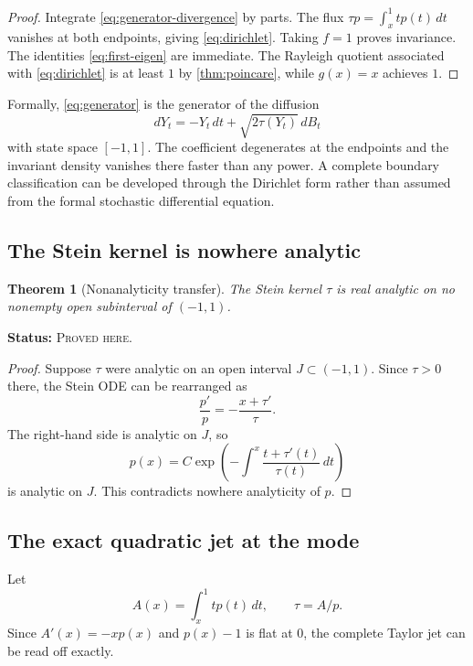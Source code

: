 \documentclass[11pt,oneside]{article}
\newtheorem{theorem}{Theorem}[section]
\theoremstyle{definition}
\theoremstyle{remark}
\newcommand{\ProvedHere}{\textcolor{statusgreen}{\textsc{Proved here}}}
\newcommand{\Status}[1]{\par\smallskip\noindent\textbf{Status:} #1.\par\smallskip}
\begin{document}
\begin{proof}
Integrate \eqref{eq:generator-divergence} by parts.  The flux
$\tau p=\int_x^1tp(t)\,dt$ vanishes at both endpoints, giving
\eqref{eq:dirichlet}.  Taking $f=1$ proves invariance.  The identities
\eqref{eq:first-eigen} are immediate.  The Rayleigh quotient associated with
\eqref{eq:dirichlet} is at least $1$ by \cref{thm:poincare}, while $g(x)=x$
achieves $1$.
\end{proof}

Formally, \eqref{eq:generator} is the generator of the diffusion
\begin{equation}\label{eq:sde}
 dY_t=-Y_t\,dt+\sqrt{2\tau(Y_t)}\,dB_t
\end{equation}
with state space $[-1,1]$.  The coefficient degenerates at the endpoints and the
invariant density vanishes there faster than any power.  A complete boundary
classification can be developed through the Dirichlet form rather than assumed
from the formal stochastic differential equation.

\subsection{The Stein kernel is nowhere analytic}
\begin{theorem}[Nonanalyticity transfer]\label{thm:tau-nonanalytic}
The Stein kernel $\tau$ is real analytic on no nonempty open subinterval of
$(-1,1)$.
\end{theorem}
\Status{\ProvedHere}

\begin{proof}
Suppose $\tau$ were analytic on an open interval $J\subset(-1,1)$.  Since
$\tau>0$ there, the Stein ODE can be rearranged as
\begin{equation}\label{eq:p-analytic-ode}
 \frac{p'}p=-\frac{x+\tau'}{\tau}.
\end{equation}
The right-hand side is analytic on $J$, so
\[
 p(x)=C\exp\!\left(-\int^x\frac{t+\tau'(t)}{\tau(t)}\,dt\right)
\]
is analytic on $J$.  This contradicts nowhere analyticity of $p$.
\end{proof}

\subsection{The exact quadratic jet at the mode}
Let
\[
 A(x)=\int_x^1t p(t)\,dt,
 \qquad \tau=A/p.
\]
Since $A'(x)=-xp(x)$ and $p(x)-1$ is flat at $0$, the complete Taylor jet can be
read off exactly.
\end{document}
